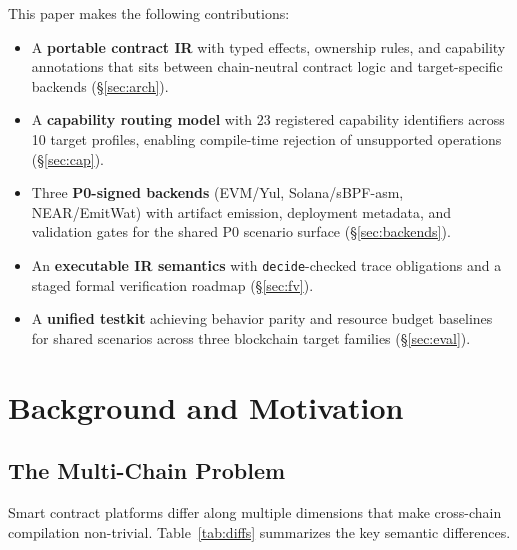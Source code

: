 \documentclass[sigconf]{acmart}
\begin{document}
This paper makes the following contributions:

\begin{itemize}[leftmargin=*]
  \item A \textbf{portable contract IR} with typed effects, ownership rules, and capability
  annotations that sits between chain-neutral contract logic and target-specific backends
  (\S\ref{sec:arch}).
  \item A \textbf{capability routing model} with 23 registered capability identifiers across 10
  target profiles, enabling compile-time rejection of unsupported operations (\S\ref{sec:cap}).
  \item Three \textbf{P0-signed backends} (EVM/Yul, Solana/sBPF-asm, NEAR/EmitWat)
  with artifact emission, deployment metadata, and validation gates for the shared
  P0 scenario surface
  (\S\ref{sec:backends}).
  \item An \textbf{executable IR semantics} with \texttt{decide}-checked trace obligations and a
  staged formal verification roadmap (\S\ref{sec:fv}).
  \item A \textbf{unified testkit} achieving behavior parity and resource budget baselines for
  shared scenarios across three blockchain target families (\S\ref{sec:eval}).
\end{itemize}

\section{Background and Motivation}
\label{sec:bg}

\subsection{The Multi-Chain Problem}

Smart contract platforms differ along multiple dimensions that make cross-chain compilation
non-trivial. Table~\ref{tab:diffs} summarizes the key semantic differences.
\end{document}
